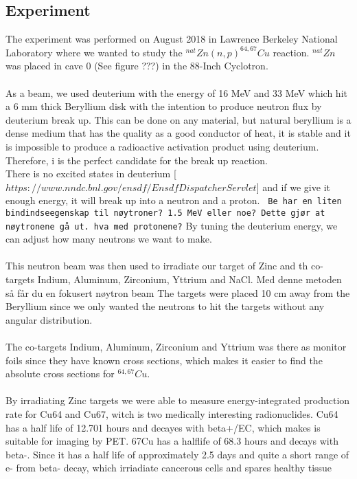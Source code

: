 \documentclass[11pt,showpacs,preprintnumbers,footinbib,amsmath,amssymb,aps,prl,groupedaddress,superscriptaddress,showkeys]{revtex4-1}
\begin{document}
\subsection{Experiment}
\noindent
The experiment was performed on August 2018 in Lawrence Berkeley National Laboratory where we wanted to study the $^{nat}Zn(n,p)^{64,67}Cu$ reaction. $^{nat}Zn$ was placed in cave 0 (See figure ???) in the 88-Inch Cyclotron.\\
\\
As a beam, we used deuterium with the energy of 16 MeV and 33 MeV which hit a 6 mm thick Beryllium disk with the intention to produce neutron flux by deuterium break up. This can be done on any material, but natural beryllium is a dense medium that has the quality as a good conductor of heat, it is stable and it is impossible to produce a radioactive activation product using deuterium. Therefore, i is the perfect candidate for the break up reaction.\\ There is no excited states in deuterium [$https://www.nndc.bnl.gov/ensdf/EnsdfDispatcherServlet$] and if we give it enough energy, it will break up into a neutron and a proton. \texttt{ Be har en liten bindindseegenskap til nøytroner? 1.5 MeV eller noe? Dette gjør at nøytronene gå ut. hva med protonene?} By tuning the deuterium energy, we can adjust how many neutrons we want to make.\\
\\
This neutron beam was then used to irradiate our target of Zinc and th co-targets Indium, Aluminum, Zirconium, Yttrium and NaCl. Med denne metoden så får du en fokusert nøytron beam The targets were placed 10 cm away from the Beryllium since we only wanted the neutrons to hit the targets without any angular distribution. \\
\\
The co-targets Indium, Aluminum, Zirconium and Yttrium was there as monitor foils since they have known cross sections, which makes it easier to find the absolute cross sections for $^{64,67}Cu$.\\
\\
By irradiating Zinc targets we were able to measure energy-integrated production rate for Cu64 and Cu67, witch is two medically interesting radionuclides. Cu64 has a half life of 12.701 hours and decayes with beta+/EC, which makes is suitable for imaging by PET. 67Cu has a halflife of 68.3 hours and decays with beta-. Since it has a half life of approximately 2.5 days and quite a short range of e- from beta- decay, which irriadiate cancerous cells and spares healthy tissue \\
\\
\end{document}
